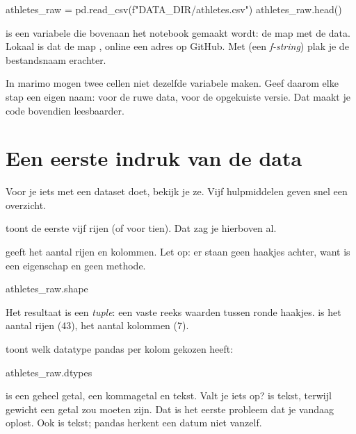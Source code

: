 \documentclass[11pt,a4paper]{article}
\begin{document}
\begin{python}
athletes_raw = pd.read_csv(f"{DATA_DIR}/athletes.csv")
athletes_raw.head()
\end{python}

 is een variabele die bovenaan het notebook gemaakt
wordt: de map met de data. Lokaal is dat de map , online een
adres op GitHub. Met  (een
\emph{f-string}) plak je de bestandsnaam erachter.

\begin{opgelet}
In marimo mogen twee cellen niet dezelfde variabele maken. Geef daarom
elke stap een eigen naam:  voor de ruwe data,
 voor de opgekuiste versie. Dat maakt je code
bovendien leesbaarder.
\end{opgelet}

\section{Een eerste indruk van de data}

Voor je iets met een dataset doet, bekijk je ze. Vijf hulpmiddelen
geven snel een overzicht.

\textbf{} toont de eerste vijf rijen (of 
voor tien). Dat zag je hierboven al.

\textbf{} geeft het aantal rijen en kolommen. Let op: er
staan geen haakjes achter, want  is een eigenschap en geen
methode.

\begin{python}
athletes_raw.shape
\end{python}

Het resultaat is een \emph{tuple}: een vaste reeks waarden tussen ronde
haakjes.  is het aantal rijen (43),
 het aantal kolommen (7).

\textbf{} toont welk datatype pandas per kolom gekozen
heeft:

\begin{python}
athletes_raw.dtypes
\end{python}

 is een geheel getal,  een kommagetal en
 tekst. Valt je iets op?  is tekst, terwijl
gewicht een getal zou moeten zijn. Dat is het eerste probleem dat je
vandaag oplost. Ook  is tekst; pandas herkent een datum
niet vanzelf.
\end{document}
